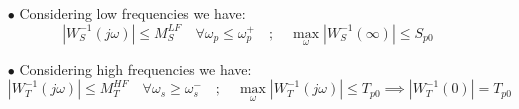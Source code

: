 \documentclass[a4paper,10pt,titlepage]{article}
\numberwithin{equation}{subsection}
\begin{document}
	\begin{enumerate}
		\item[$\bullet$] Considering low frequencies we have:
		\begin{equation}
			\left| W_S^{-1}(j\omega) \right| \leq M_S^{LF} \quad \forall 	\omega_p\leq\omega_p^+ \quad ; \quad \max_\omega \left| W_S^{-1}(\infty) \right| \leq S_{p0}
		\end{equation}	
		\item[$\bullet$] Considering high frequencies we have:
		\begin{equation}
			\left| W_T^{-1}(j\omega) \right| \leq M_T^{HF} \quad \forall 	\omega_s\geq\omega_s^- \quad ; \quad \max_\omega \left| W_T^{-1}(j\omega) \right| \leq T_{p0} \implies \left| W_T^{-1}(0) \right| = T_{p0}
		\end{equation}
	\end{enumerate}
	
\end{document}
